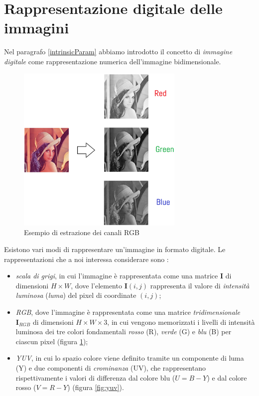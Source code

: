 \section{Rappresentazione digitale delle immagini}
\label{rappresentazImmagini}
Nel paragrafo \ref{intrinsicParam} abbiamo introdotto il concetto di \textit{immagine digitale} come rappresentazione numerica dell'immagine bidimensionale.
	\begin{figure}[tb]
		\centering
		\includegraphics[width=8cm]{./pictures/lenaRGB}
		\caption{Esempio di estrazione dei canali RGB}
		\label{fig:lenaRGB}
	\end{figure}
Esistono vari modi di rappresentare un'immagine in formato digitale.
Le rappresentazioni che a noi interessa considerare sono \cite{forsyth2002computer}:
\begin{itemize}
	\item \textit{scala di grigi}, in cui l'immagine \`e rappresentata come una matrice $\textbf{I}$ di dimensioni $H \times W$, dove l'elemento $\textbf{I}(i,j)$ rappresenta il valore di \textit{intensit\`a luminosa} (\textit{luma}) del pixel di coordinate $(i, j)$;
	\item \textit{RGB}, dove l'immagine \`e rappresentata come una matrice \textit{tridimensionale} $\textbf{I}_{RGB}$ di dimensioni $H \times W \times 3$, in cui vengono memorizzati i livelli di intensit\`a luminosa dei tre colori fondamentali \textit{rosso} (R), \textit{verde} (G) e \textit{blu} (B) per ciascun pixel (figura \ref{fig:lenaRGB}); 
	\item \textit{YUV}, in cui lo spazio colore viene definito tramite un componente di luma (Y) e due componenti di \textit{crominanza} (UV), che rappresentano rispettivamente i valori di differenza dal colore blu ($U = B - Y$) e dal colore rosso ($V = R - Y$) (figura \ref{fig:yuv}).
\end{itemize}
